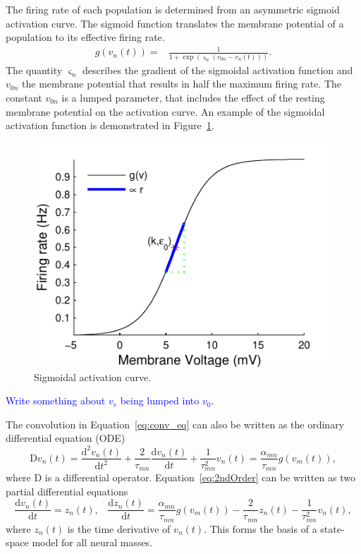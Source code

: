 \documentclass{article}%
\newcommand{\dean}[1]{\textcolor{blue}{#1}}
\begin{document}
The firing rate of each population is determined from an asymmetric sigmoid activation curve. The sigmoid function translates the membrane potential of a population to its effective firing rate.
\begin{align}\label{eq:sigmoid}
    g\left(v_n(t)\right) =& \frac{1}{1+\exp{\left(\varsigma_n\left(v_{0n} - v_n(t)\right)\right)}}.
\end{align}
The quantity $\varsigma_n$ describes the gradient of the sigmoidal activation function and $v_{0n}$ the membrane potential that results in half the maximum firing rate. The constant $v_{0n}$ is a lumped parameter, that includes the effect of the resting membrane potential on the activation curve. An example of the sigmoidal activation function is demonstrated in Figure~\ref{fig: PSP2FR_final}.

  \begin{figure}%
	\centering
		\includegraphics{PSP2FRNaming.pdf}
	\caption{Sigmoidal activation curve.}
	\label{fig: PSP2FR_final}
\end{figure} %

 \dean{Write something about $v_r$ being lumped into $v_0$.}

The convolution in Equation~\ref{eq:conv_eq} can also be written as the ordinary differential equation (ODE)
\begin{equation}\label{eq:2ndOrder}
    \mathrm{D}v_n(t) = \frac{\mathrm{d}^2 v_n(t)}{\mathrm{d}t^2} + \frac{2}{\tau_{mn}}\frac{\mathrm{d} v_n(t)}{\mathrm{d}t} + \frac{1}{\tau_{mn}^2} v_n(t) = \frac{\alpha_{mn}}{\tau_{mn}} g(v_m(t)),
\end{equation}
where $\mathrm{D}$ is a differential operator. Equation~\ref{eq:2ndOrder} can be written as two partial differential equations
\begin{equation} \label{eq:2ndOrderNMM}
    \frac{\mathrm{d} v_n(t)}{\mathrm{d}t} = z_n(t),\,\,\,\,\,    \frac{\mathrm{d}z_n(t)}{\mathrm{d}t} = \frac{\alpha_{mn}}{\tau_{mn}} g(v_m(t)) - \frac{2}{\tau_{mn}}z_n(t) - \frac{1}{\tau_{mn}^2} v_n(t),
\end{equation}
where $z_n(t)$ is the time derivative of $v_n(t)$. This forms the basis of a state-space model for all neural masses.
\end{document}

